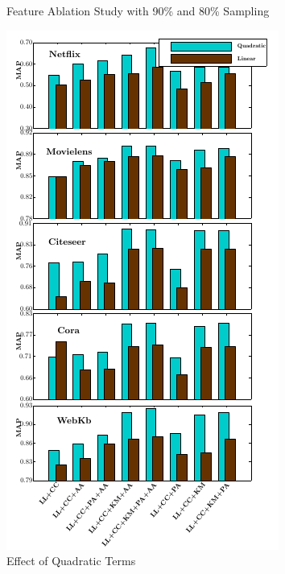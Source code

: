\begin{figure}
\caption{Feature Ablation Study with 90\% and 80\% Sampling}
\label{fig:arbitration_study}
\end{figure}

\begin{figure}
\centering
\includegraphics[width=\textwidth,height=\textheight,keepaspectratio]{link_prediction/images/quad_study.png}
\caption{Effect of Quadratic Terms}
\label{fig:quad_study}
\end{figure}

